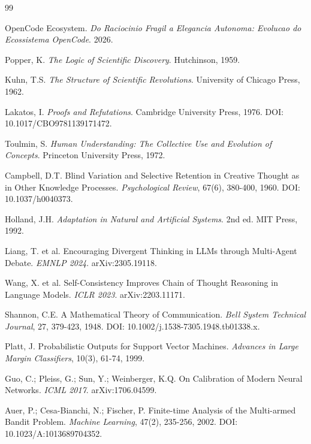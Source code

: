 \documentclass[5p]{elsarticle}
\begin{document}
\begin{thebibliography}{99}

OpenCode Ecosystem. \textit{Do Raciocinio Fragil a Elegancia Autonoma:
Evolucao do Ecossistema OpenCode}. 2026.

Popper, K. \textit{The Logic of Scientific Discovery}. Hutchinson, 1959.

Kuhn, T.S. \textit{The Structure of Scientific Revolutions}. University of
Chicago Press, 1962.

Lakatos, I. \textit{Proofs and Refutations}. Cambridge University Press, 1976.
DOI: 10.1017/CBO9781139171472.

Toulmin, S. \textit{Human Understanding: The Collective Use and Evolution of
Concepts}. Princeton University Press, 1972.

Campbell, D.T. Blind Variation and Selective Retention in Creative Thought
as in Other Knowledge Processes. \textit{Psychological Review}, 67(6),
380-400, 1960. DOI: 10.1037/h0040373.

Holland, J.H. \textit{Adaptation in Natural and Artificial Systems}. 2nd ed.
MIT Press, 1992.

Liang, T. et al. Encouraging Divergent Thinking in LLMs through Multi-Agent
Debate. \textit{EMNLP 2024}. arXiv:2305.19118.

Wang, X. et al. Self-Consistency Improves Chain of Thought Reasoning in
Language Models. \textit{ICLR 2023}. arXiv:2203.11171.

Shannon, C.E. A Mathematical Theory of Communication. \textit{Bell System
Technical Journal}, 27, 379-423, 1948. DOI: 10.1002/j.1538-7305.1948.tb01338.x.

Platt, J. Probabilistic Outputs for Support Vector Machines. \textit{Advances
in Large Margin Classifiers}, 10(3), 61-74, 1999.

Guo, C.; Pleiss, G.; Sun, Y.; Weinberger, K.Q. On Calibration of Modern
Neural Networks. \textit{ICML 2017}. arXiv:1706.04599.

Auer, P.; Cesa-Bianchi, N.; Fischer, P. Finite-time Analysis of the
Multi-armed Bandit Problem. \textit{Machine Learning}, 47(2), 235-256, 2002.
DOI: 10.1023/A:1013689704352.


\end{thebibliography}
\end{document}

